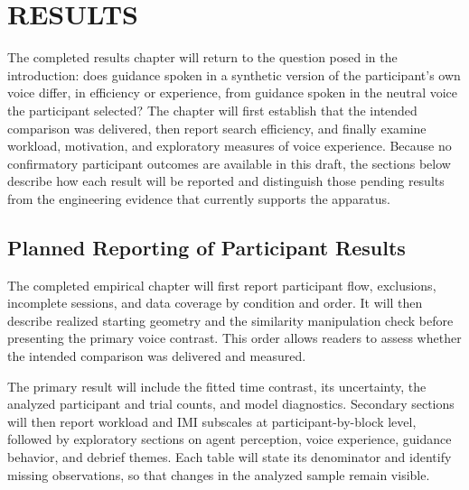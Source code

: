 \chapter{RESULTS}
\label{ch:evaluation}
The completed results chapter will return to the question posed in the introduction: does guidance spoken in a synthetic version of the participant's own voice differ, in efficiency or experience, from guidance spoken in the neutral voice the participant selected? The chapter will first establish that the intended comparison was delivered, then report search efficiency, and finally examine workload, motivation, and exploratory measures of voice experience. Because no confirmatory participant outcomes are available in this draft, the sections below describe how each result will be reported and distinguish those pending results from the engineering evidence that currently supports the apparatus.



\section{Planned Reporting of Participant Results}
The completed empirical chapter will first report participant flow, exclusions, incomplete sessions, and data coverage by condition and order. It will then describe realized starting geometry and the similarity manipulation check before presenting the primary voice contrast. This order allows readers to assess whether the intended comparison was delivered and measured.

The primary result will include the fitted time contrast, its uncertainty, the analyzed participant and trial counts, and model diagnostics. Secondary sections will then report workload and IMI subscales at participant-by-block level, followed by exploratory sections on agent perception, voice experience, guidance behavior, and debrief themes. Each table will state its denominator and identify missing observations, so that changes in the analyzed sample remain visible.

